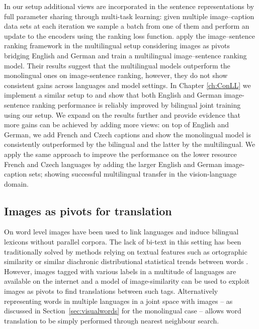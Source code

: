 In our setup additional views are incorporated in the sentence representations
by full parameter sharing through multi-task learning:
given multiple image--caption data sets at each iteration we sample
a batch from one of them and perform an update to the encoders
using the ranking loss function.
\cite{gella2017image} apply the image--sentence ranking framework in the multilingual setup
considering images as pivots bridging English and German and train a multilingual
image--sentence ranking model.
Their results suggest that the multilingual models outperform the monolingual ones on image-sentence
ranking, however, they do not show consistent gains across languages and model settings.
In Chapter \ref{ch:ConLL} we implement a similar setup to \cite{gella2017image}
and  show that both English and German image-sentence
ranking performance is reliably improved by bilingual joint training using our setup.
We expand on the results further and provide evidence that more gains can be
achieved by adding more views: on top of English and German, we
add French and Czech captions and show the monolingual model is consistently
outperformed by the bilingual and the latter by the multilingual.
We apply the same approach to improve the performance on the lower resource
French and Czech languages by adding the larger
English and German image-caption sets; showing successful multilingual
transfer in the vision-language domain.


\subsection{Images as pivots for translation}
\label{sec:imgpivot}

On word level images have been used to link languages and induce bilingual
lexicons without parallel corpora. The lack of bi-text in this setting has
been traditionally solved by methods relying on textual features
such as ortographic similarity \citep{haghighi2008learning} or similar diachronic distributional
statistical trends between words \citep{schafer2002inducing}.
However, images tagged with various labels in a multitude of languages are
available on the internet and a model of image-similarity can be used to exploit
images as pivots to find translations between such tags. Alternatively representing words in multiple
languages in a joint space with images
-- as discussed in Section~\ref{sec:visualwords} for the monolingual case --
allows word translation to be simply performed through nearest neighbour search.

